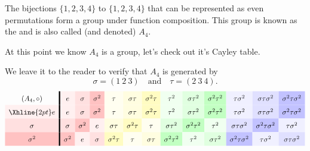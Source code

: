\documentclass{ximera}
\begin{document}
\begin{example}
  The bijections $\{1,2,3,4\}$ to $\{1,2,3,4\}$ that can be represented
  as even permutations form a group under function composition. This
  group is known as the  and is
  also called (and denoted) $A_4$.


  At this point we know $A_4$ is a group, let's check out it's Cayley
  table.

  We leave it to the reader to verify that $A_4$ is generated by
  \[
  \sigma=(1\ 2\ 3)\quad \text{and}\quad \tau = (2\ 3\ 4).
  \]
  \begin{gather*}
    \renewcommand{\arraystretch}{1.6}
      \begin{array}{c!{\vline width 2pt}cccccccccccc}
      (A_{4},\circ)& e\cellcolor{red!6!white}     & \sigma\cellcolor{red!12!white}     & \sigma^2\cellcolor{red!24!white}   & \tau \cellcolor{yellow!6!white}    & \sigma\tau \cellcolor{yellow!12!white}  & \sigma^2 \tau\cellcolor{yellow!24!white} & \tau^2\cellcolor{green!6!white}    &  \sigma \tau^2\cellcolor{green!12!white}  &  \sigma^2 \tau^2\cellcolor{green!24!white} & \tau\sigma^2 \cellcolor{blue!6!white} & \sigma\tau\sigma^2 \cellcolor{blue!12!white}& \sigma^2 \tau \sigma^2\cellcolor{blue!24!white}\\  \Xhline{2pt}
      e \cellcolor{red!6!white}         & e\cellcolor{red!6!white}         & \sigma\cellcolor{red!12!white}           & \sigma^2\cellcolor{red!24!white}   & \tau \cellcolor{yellow!6!white}    & \sigma\tau \cellcolor{yellow!12!white}  & \sigma^2 \tau\cellcolor{yellow!24!white} & \tau^2\cellcolor{green!6!white}    &  \sigma \tau^2\cellcolor{green!12!white}  &  \sigma^2 \tau^2\cellcolor{green!24!white} & \tau\sigma^2 \cellcolor{blue!6!white} & \sigma\tau\sigma^2 \cellcolor{blue!12!white}& \sigma^2 \tau \sigma^2\cellcolor{blue!24!white}\\ 
      \sigma\cellcolor{red!12!white}         & \sigma\cellcolor{red!12!white}        & \sigma^2\cellcolor{red!24!white}            & e\cellcolor{red!6!white}     & \sigma\tau\cellcolor{yellow!12!white} & \sigma^2\tau \cellcolor{yellow!24!white}    & \tau \cellcolor{yellow!6!white}   & \sigma\tau^2 \cellcolor{green!12!white}  & \sigma^2\tau^2 \cellcolor{green!24!white} & \tau^2 \cellcolor{green!6!white} & \sigma \tau\sigma^2 \cellcolor{blue!12!white} & \sigma^2 \tau\sigma^2 \cellcolor{blue!24!white} & \tau\sigma^2 \cellcolor{blue!6!white}\\  
      \sigma^2\cellcolor{red!24!white}       & \sigma^2\cellcolor{red!24!white}      & e\cellcolor{red!6!white}           & \sigma\cellcolor{red!12!white}    & \sigma^2 \tau \cellcolor{yellow!24!white}   & \tau \cellcolor{yellow!6!white} & \sigma\tau \cellcolor{yellow!12!white}   &  \sigma^2\tau^2 \cellcolor{green!24!white}  & \tau^2 \cellcolor{green!6!white} & \sigma\tau^2\cellcolor{green!12!white}  & \sigma^2\tau\sigma^2\cellcolor{blue!24!white} & \tau\sigma^2\cellcolor{blue!6!white} & \sigma\tau\sigma^2\cellcolor{blue!12!white}\\  

\end{array}
\end{gather*}
\end{example}
\end{document}
